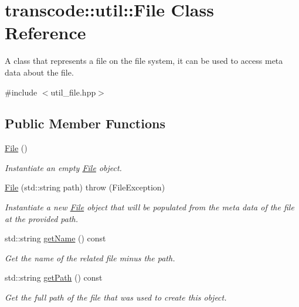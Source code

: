 \hypertarget{classtranscode_1_1util_1_1File}{
\section{transcode::util::File Class Reference}
\label{classtranscode_1_1util_1_1File}
}


A class that represents a file on the file system, it can be used to access meta data about the file.  




{\ttfamily \#include $<$util\_\-file.hpp$>$}

\subsection*{Public Member Functions}
\begin{DoxyCompactItemize}
\item 
\hyperlink{classtranscode_1_1util_1_1File_ad459dd3cc090abbbb220a87f1909d7f9}{File} ()
\begin{DoxyCompactList}\small\item\em Instantiate an empty \hyperlink{classtranscode_1_1util_1_1File}{File} object. \item\end{DoxyCompactList}\item 
\hyperlink{classtranscode_1_1util_1_1File_a60d3a3b965968122d87e319c8181c866}{File} (std::string path)  throw (FileException)
\begin{DoxyCompactList}\small\item\em Instantiate a new \hyperlink{classtranscode_1_1util_1_1File}{File} object that will be populated from the meta data of the file at the provided path. \item\end{DoxyCompactList}\item 
std::string \hyperlink{classtranscode_1_1util_1_1File_a80cc652ec8b51ecac79dfcf469ae3c2f}{getName} () const 
\begin{DoxyCompactList}\small\item\em Get the name of the related file minus the path. \item\end{DoxyCompactList}\item 
std::string \hyperlink{classtranscode_1_1util_1_1File_a22b68c8fa9d48982164da648c18c4f09}{getPath} () const 
\begin{DoxyCompactList}\small\item\em Get the full path of the file that was used to create this object. \item\end{DoxyCompactList}\item 

\end{DoxyCompactItemize}
